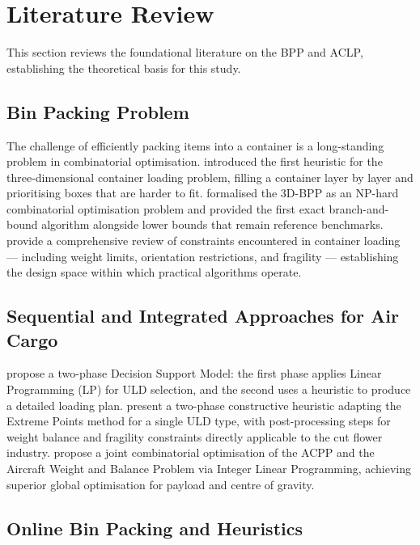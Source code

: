\documentclass[12pt,a4paper]{article}
\begin{document}
\section{Literature Review}
\label{sec:litreview}

This section reviews the foundational literature on the BPP and ACLP,
establishing the theoretical basis for this study.

\subsection{Bin Packing Problem}

The challenge of efficiently packing items into a container is a
long-standing problem in combinatorial optimisation.
\citet{George1980} introduced the first heuristic for the
three-dimensional container loading problem, filling a container layer
by layer and prioritising boxes that are harder to fit.
\citet{Martello2000} formalised the 3D-BPP as an NP-hard
combinatorial optimisation problem and provided the first exact
branch-and-bound algorithm alongside lower bounds that remain reference
benchmarks.
\citet{Bortfeldt2013} provide a comprehensive review of constraints
encountered in container loading --- including weight limits,
orientation restrictions, and fragility --- establishing the design
space within which practical algorithms operate.

\subsection{Sequential and Integrated Approaches for Air Cargo}

\citet{Chan2006a} propose a two-phase Decision Support Model: the
first phase applies Linear Programming (LP) for ULD selection, and
the second uses a heuristic to produce a detailed loading plan.
\citet{Paquay2018} present a two-phase constructive heuristic adapting
the Extreme Points method for a single ULD type, with post-processing
steps for weight balance and fragility constraints directly applicable
to the cut flower industry.
\citet{Zhao2023} propose a joint combinatorial optimisation of the
ACPP and the Aircraft Weight and Balance Problem via Integer Linear
Programming, achieving superior global optimisation for payload and
centre of gravity.

\subsection{Online Bin Packing and Heuristics}
\end{document}
